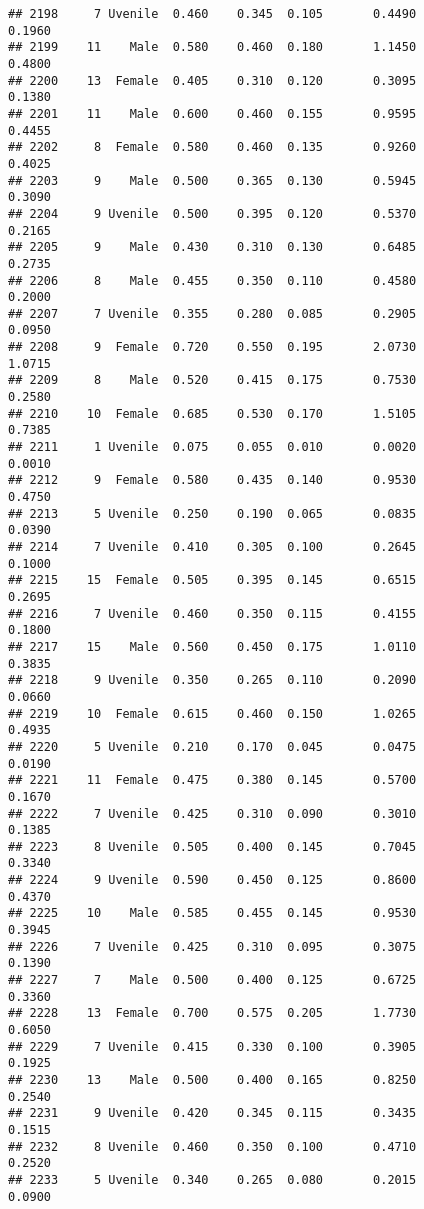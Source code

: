 \documentclass[
]{article}
\begin{document}
\begin{verbatim}
## 2198     7 Uvenile  0.460    0.345  0.105       0.4490         0.1960
## 2199    11    Male  0.580    0.460  0.180       1.1450         0.4800
## 2200    13  Female  0.405    0.310  0.120       0.3095         0.1380
## 2201    11    Male  0.600    0.460  0.155       0.9595         0.4455
## 2202     8  Female  0.580    0.460  0.135       0.9260         0.4025
## 2203     9    Male  0.500    0.365  0.130       0.5945         0.3090
## 2204     9 Uvenile  0.500    0.395  0.120       0.5370         0.2165
## 2205     9    Male  0.430    0.310  0.130       0.6485         0.2735
## 2206     8    Male  0.455    0.350  0.110       0.4580         0.2000
## 2207     7 Uvenile  0.355    0.280  0.085       0.2905         0.0950
## 2208     9  Female  0.720    0.550  0.195       2.0730         1.0715
## 2209     8    Male  0.520    0.415  0.175       0.7530         0.2580
## 2210    10  Female  0.685    0.530  0.170       1.5105         0.7385
## 2211     1 Uvenile  0.075    0.055  0.010       0.0020         0.0010
## 2212     9  Female  0.580    0.435  0.140       0.9530         0.4750
## 2213     5 Uvenile  0.250    0.190  0.065       0.0835         0.0390
## 2214     7 Uvenile  0.410    0.305  0.100       0.2645         0.1000
## 2215    15  Female  0.505    0.395  0.145       0.6515         0.2695
## 2216     7 Uvenile  0.460    0.350  0.115       0.4155         0.1800
## 2217    15    Male  0.560    0.450  0.175       1.0110         0.3835
## 2218     9 Uvenile  0.350    0.265  0.110       0.2090         0.0660
## 2219    10  Female  0.615    0.460  0.150       1.0265         0.4935
## 2220     5 Uvenile  0.210    0.170  0.045       0.0475         0.0190
## 2221    11  Female  0.475    0.380  0.145       0.5700         0.1670
## 2222     7 Uvenile  0.425    0.310  0.090       0.3010         0.1385
## 2223     8 Uvenile  0.505    0.400  0.145       0.7045         0.3340
## 2224     9 Uvenile  0.590    0.450  0.125       0.8600         0.4370
## 2225    10    Male  0.585    0.455  0.145       0.9530         0.3945
## 2226     7 Uvenile  0.425    0.310  0.095       0.3075         0.1390
## 2227     7    Male  0.500    0.400  0.125       0.6725         0.3360
## 2228    13  Female  0.700    0.575  0.205       1.7730         0.6050
## 2229     7 Uvenile  0.415    0.330  0.100       0.3905         0.1925
## 2230    13    Male  0.500    0.400  0.165       0.8250         0.2540
## 2231     9 Uvenile  0.420    0.345  0.115       0.3435         0.1515
## 2232     8 Uvenile  0.460    0.350  0.100       0.4710         0.2520
## 2233     5 Uvenile  0.340    0.265  0.080       0.2015         0.0900

\end{verbatim}
\end{document}
